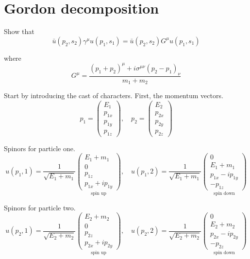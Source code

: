 

\section*{Gordon decomposition}

Show that
\begin{equation*}
\bar{u}(p_2,s_2)\gamma^\mu u(p_1,s_1)
=\bar{u}(p_2,s_2)G^\mu u(p_1,s_1)
\end{equation*}

where
\begin{equation*}
G^\mu=\frac{(p_1+p_2)^\mu+i\sigma^{\mu\nu}(p_2-p_1)_\nu}{m_1+m_2}
\end{equation*}

Start by introducing the cast of characters.
First, the momentum vectors.
\begin{equation*}
p_1=\begin{pmatrix}E_1\\p_{1x}\\p_{1y}\\p_{1z}\end{pmatrix},\quad
p_2=\begin{pmatrix}E_2\\p_{2x}\\p_{2y}\\p_{2z}\end{pmatrix}
\end{equation*}

Spinors for particle one.
\begin{equation*}
u(p_1,1)=\frac{1}{\sqrt{E_1+m_1}}\underset{\text{spin up}}
{\begin{pmatrix}E_1+m_1\\0\\p_{1z}\\p_{1x}+ip_{1y}\end{pmatrix}},\quad
u(p_1,2)=\frac{1}{\sqrt{E_1+m_1}}\underset{\text{spin down}}
{\begin{pmatrix}0\\E_1+m_1\\p_{1x}-ip_{1y}\\-p_{1z}\end{pmatrix}}
\end{equation*}

Spinors for particle two.
\begin{equation*}
u(p_2,1)=\frac{1}{\sqrt{E_2+m_2}}\underset{\text{spin up}}
{\begin{pmatrix}E_2+m_2\\0\\p_{2z}\\p_{2x}+ip_{2y}\end{pmatrix}},\quad
u(p_2,2)=\frac{1}{\sqrt{E_2+m_2}}\underset{\text{spin down}}
{\begin{pmatrix}0\\E_2+m_2\\p_{2x}-ip_{2y}\\-p_{2z}\end{pmatrix}}
\end{equation*}


